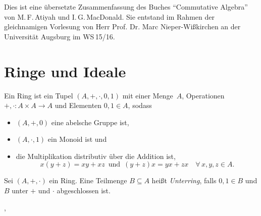 \documentclass{cheat-sheet}
\begin{document}
\raggedcolumns %


Dies ist eine übersetzte Zusammenfassung des Buches "`Commutative Algebra"' von M.\,F.\,Atiyah und I.\,G.\,MacDonald.
Sie entstand im Rahmen der gleichnamigen Vorlesung von Herr Prof. Dr. Marc Nieper-Wißkirchen an der Universität Augsburg im WS\,15/16.


\section{Ringe und Ideale}



\begin{defn}
  Ein Ring ist ein Tupel $(A, +, \cdot, 0, 1)$ mit einer Menge~$A$, Operationen $+, \cdot : A \times A \to A$ und Elementen $0, 1 \in A$, sodass
  \begin{itemize}
    \item $(A, +, 0)$ eine abelsche Gruppe ist,
    \item $(A, \cdot, 1)$ ein Monoid ist und
    \item die Multiplikation distributiv über die Addition ist, \dh{}
    \[
      x (y + z) = x y + x z
      \enspace \text{und} \enspace
      (y + z) x = y x + z x
      \quad \forall \, x, y, z \in A.
    \]
  \end{itemize}
\end{defn}

\begin{bspe}
  \inlineitem{$\Z$,} \enspace
   \enspace
\end{bspe}


\begin{defn}
  Sei $(A, +, \cdot)$ ein Ring.
  Eine Teilmenge $B \subseteq A$ heißt \emph{Unterring}, falls $0, 1 \in B$ und $B$ unter $+$ und $\cdot$ abgeschlossen ist.
\end{defn}

\begin{bspe}
  \inlineitem{$\Z \subset \Q$}, \enspace
\end{bspe}
\end{document}
